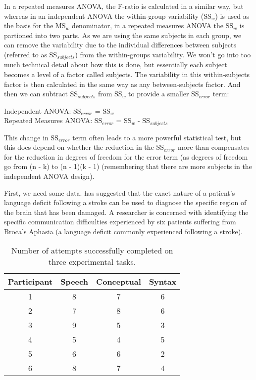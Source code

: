 In a repeated measures ANOVA, the $\mbox{F-ratio}$ is calculated in a similar way, but whereas in an independent ANOVA the within-group variability ($\mbox{SS}_w$) is used as the basis for the $\mbox{MS}_w$ denominator, in a repeated measures ANOVA the $\mbox{SS}_w$ is partioned into two parts. As we are using the same subjects in each group, we can remove the variability due to the individual differences between subjects (referred to as $\mbox{SS}_{subjects}$) from the within-groups variability. We won't go into too much technical detail about how this is done, but essentially each subject becomes a level of a factor called subjects. The variability in this within-subjects factor is then calculated in the same way as any between-subjects factor. And then we can subtract $\mbox{SS}_{subjects}$ from $\mbox{SS}_w$ to provide a smaller $\mbox{SS}_{error}$ term: 

\begin{center}
Independent ANOVA: $\mbox{SS}_{error}$ = $\mbox{SS}_w$ \\ \vspace{0.3cm}
Repeated Measures ANOVA: $\mbox{SS}_{error}$ = $\mbox{SS}_w$ - $\mbox{SS}_{subjects}$
\end{center}

This change in $\mbox{SS}_{error}$ term often leads to a more powerful statistical test, but this does depend on whether the reduction in the $\mbox{SS}_{error}$ more than compensates for the reduction in degrees of freedom for the error term (as degrees of freedom go from (n - k) to (n - 1)(k - 1) (remembering that there are more subjects in the independent ANOVA design).


First, we need some data. \textcite{Geschwind1972} has suggested that the exact nature of a patient’s language deficit following a stroke can be used to diagnose the specific region of the brain that has been damaged. A researcher is concerned with identifying the specific communication difficulties experienced by six patients suffering from Broca’s Aphasia (a language deficit commonly experienced following a stroke). 

\begin{table}[!ht]
\caption{Number of attempts successfully completed 
on three experimental tasks.} \label{tab:RManova} \tabcapsep
\begin{center}
\begin{tabular}{c|ccc} 
Participant	& Speech & 	Conceptual & Syntax \\ \hline
1 &	8 &	7 &	6 \\
2 &	7 &	8 &	6 \\
3 &	9 &	5 &	3 \\
4 &	5 &	4 &	5 \\
5 &	6 &	6 &	2 \\
6 &	8 &	7 &	4 \\
\end{tabular}
\tabcapsep \HR
\end{center}
\end{table}

